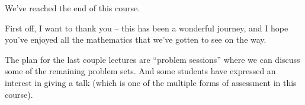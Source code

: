 \documentclass{homework}
\author{Jim Fowler}
\date{Week 16: Applications}
\begin{document}
\maketitle

We've reached the end of this course.

First off, I want to thank you -- this has been a wonderful journey,
and I hope you've enjoyed all the mathematics that we've gotten to see
on the way.

The plan for the last couple lectures are ``problem sessions'' where
we can discuss some of the remaining problem sets.  And some students
have expressed an interest in giving a talk (which is one of the
multiple forms of assessment in this course).
\end{document}
